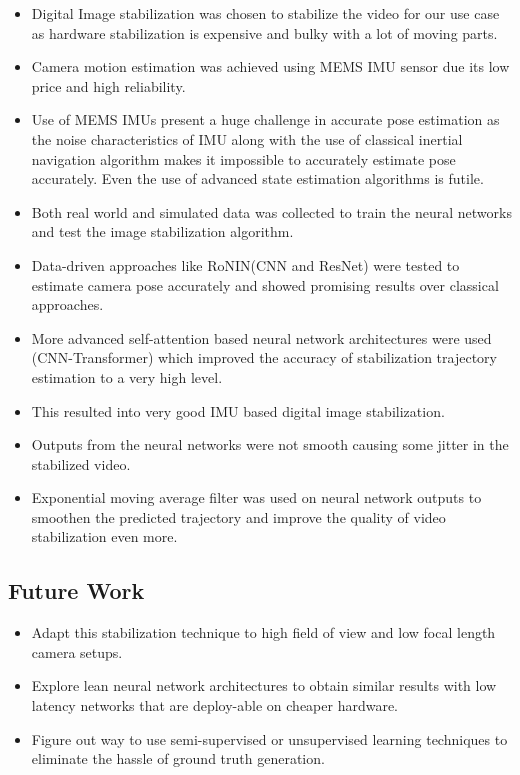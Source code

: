 \begin{itemize}
    \item Digital Image stabilization was chosen to stabilize the video for our use case as hardware stabilization is expensive and bulky with a lot of moving parts.

    \item Camera motion estimation was achieved using MEMS IMU sensor due its low price and high reliability.

    \item Use of MEMS IMUs present a huge challenge in accurate pose estimation as the noise characteristics of IMU along with the use of classical inertial navigation algorithm makes it impossible to accurately estimate pose accurately. Even the use of advanced state estimation algorithms is futile.

    \item Both real world and simulated data was collected to train the neural networks and test the image stabilization algorithm.

    \item Data-driven approaches like RoNIN(CNN and ResNet) were tested to estimate camera pose accurately and showed promising results over classical approaches.

    \item More advanced self-attention based neural network architectures were used (CNN-Transformer) which improved the accuracy of stabilization trajectory estimation to a very high level.

    \item This resulted into very good IMU based digital image stabilization.

    \item Outputs from the neural networks were not smooth causing some jitter in the stabilized video.

    \item Exponential moving average filter was used on neural network outputs to smoothen the predicted trajectory and improve the quality of video stabilization even more.

\end{itemize}


\subsection{Future Work}
\begin{itemize}
    \item Adapt this stabilization technique to high field of view and low focal length camera setups.

    \item Explore lean neural network architectures to obtain similar results with low latency networks that are deploy-able on cheaper hardware.

    \item Figure out way to use semi-supervised or unsupervised learning techniques to eliminate the hassle of ground truth generation.
    
\end{itemize}
